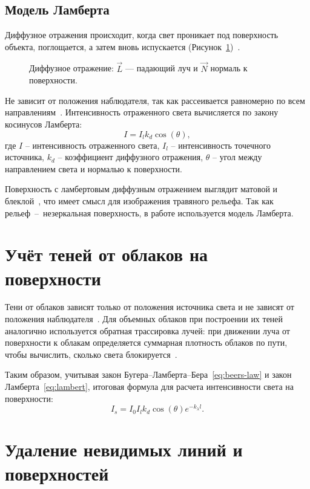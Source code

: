 \subsection{Модель Ламберта}
Диффузное отражения происходит, когда свет проникает под поверхность объекта, поглощается, а затем вновь испускается (Рисунок~\ref{fig:lambert})~\cite{rodgers1989algorithms}. 
\begin{figure}[ht!]
	\centering
	   
	\caption{Диффузное отражение: $\vec{L}$ — падающий луч и $\vec{N}$ нормаль к поверхности.}
	\label{fig:lambert}
\end{figure}

Не зависит от положения наблюдателя, так как рассеивается равномерно по всем направлениям~\cite{rodgers1989algorithms}.
Интенсивность отраженного света вычисляется по закону косинусов Ламберта:
\begin{equation}
	\label{eq:lambert}
	I = I_lk_d\cos(\theta),
\end{equation}
где $I$ -- интенсивность отраженного света, $I_l$ -- интенсивность точечного источника, $k_d$ -- коэффициент диффузного отражения, $\theta$ -- угол между направлением света и нормалью к поверхности.

Поверхность с ламбертовым диффузным отражением выглядит матовой и блеклой~\cite{rodgers1989algorithms}, что имеет смысл для изображения травяного рельефа.
Так как рельеф~--~незеркальная поверхность, в работе используется модель Ламберта.

\section{Учёт теней от облаков на поверхности}
Тени от облаков зависят только от положения источника света и не зависят от положения наблюдателя~\cite{rodgers1989algorithms}. Для объемных облаков при построении их теней аналогично используется обратная трассировка лучей: при движении луча от поверхности к облакам определяется суммарная
плотность облаков по пути, чтобы вычислить, сколько света блокируется~\cite{shadows2023}.

Таким образом, учитывая закон Бугера--Ламберта--Бера~\ref{eq:beers-law} и закон Ламберта~\ref{eq:lambert}, итоговая формула для расчета интенсивности света на поверхности:
\begin{equation}
	I_s = I_0 I_l k_d \cos(\theta) e^{-k_{\lambda} l}.
\end{equation}

\section{Удаление невидимых линий и поверхностей}
